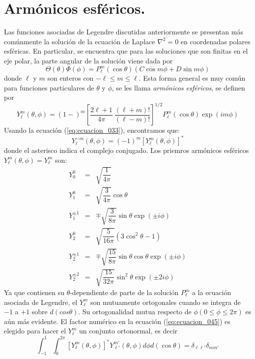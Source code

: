 \section{Armónicos esféricos.}
Las funciones asociadas de Legendre discutidas anteriormente se presentan más comúnmente la solución de la ecuación de Laplace $\nabla^{2} =0$ en coordenadas polares esféricas. En particular, se encuentra que para las soluciones que son finitas en el eje polar, la parte angular de la solución viene dada por
\[ \Theta (\theta) \Phi (\phi) = P_{\ell}^{m} (\cos \theta) (C \cos m \phi + D \sin m \phi) \]
donde $\ell$ y $m$ son enteros con $- \ell \leq m \leq \ell$. Esta forma general es muy común para funciones particulares de $\theta$ y $\phi$, se les llama \emph{armónicos esféricos}, se definen por
\begin{equation}
Y_{\ell}^{m} (\theta, \phi) = (1-)^{m} \left[ \dfrac{2 \ell + 1}{4 \pi} \: \dfrac{(\ell + m)!}{(\ell - m)!} \right]^{1/2} P_{\ell}^{m} (\cos \theta) \exp(i m \phi)
\label{eq:ecuacion_045}
\end{equation}
Usando la ecuación (\ref{eq:ecuacion_033}), encontramos que:
\[ Y_{\ell}^{-m} (\theta, \phi) =  (-1)^{m} \left[ Y_{\ell}^{m} (\theta,\phi) \right]^{*} \]
donde el asterisco indica el complejo conjugado. Los priemros armónicos esféricos $Y_{\ell}^{m}(\theta,\phi) = Y_{\ell}^{m}$ son:
\begin{eqnarray}
Y_{0}^{0} &=& \sqrt{\dfrac{1}{4 \pi}} \nonumber \\
Y_{1}^{0} &=& \sqrt{\dfrac{3}{4 \pi}} \cos \theta \nonumber \\
Y_{1}^{\pm 1} &=& \mp \sqrt{\dfrac{3}{8 \pi}} \sin \theta \exp(\pm i \phi) \nonumber \\
Y_{2}^{0} &=& \sqrt{\dfrac{5}{16 \pi}} ( 3 \cos^{2} \theta - 1) \nonumber \\
Y_{2}^{\pm 1} &=& \mp \sqrt{\dfrac{15}{8 \pi}} \sin \theta \cos \theta \exp(\pm i \phi) \nonumber \\
Y_{2}^{\pm 2} &=& \sqrt{\dfrac{15}{32 \pi}} \sin^{2} \theta \exp(\pm 2 i \phi) \nonumber
\end{eqnarray}
Ya que contienen su $\theta$-dependiente de parte de la solución $P_{\ell}^{m}$ a la ecuación asociada de Legendre, el $Y_{\ell}^{m}$ son mutuamente ortogonales cuando se integra de $-1$ a $+1$ sobre $d(cos \theta)$. Su ortogonalidad mutua respecto de $\phi (0 \leq \phi \leq 2 \pi)$ es aún más evidente. El factor numérico en la ecuación (\ref{eq:ecuacion_045}) es elegido para hacer el $Y_{\ell}^{m}$ un conjunto ortonormal, es decir
\begin{equation}
\int_{-1}^{1} \int_{0}^{2 \pi} [ Y_{\ell}^{m} (\theta, \phi) ]^{*} Y_{\ell'}^{m'} (\theta, \phi) d \phi d(\cos \theta) = \delta_{\ell \ell'} \delta_{m m'}
\label{eq:ecuacion_046}
\end{equation}
